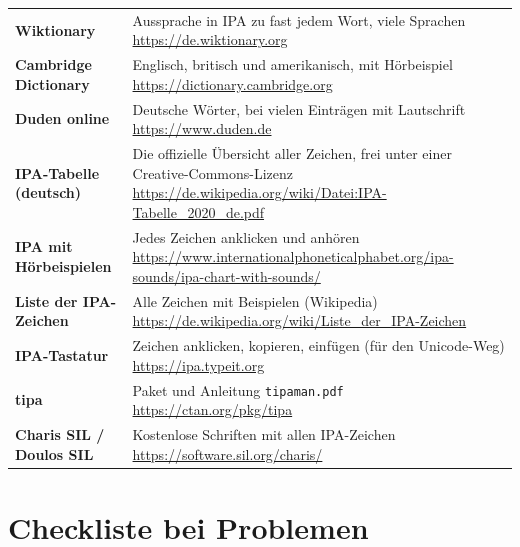 \begin{center}
\small
\begin{tabular}{@{}>{\raggedright\arraybackslash}p{3.8cm}>{\raggedright\arraybackslash}p{11.6cm}@{}}
	\toprule
	\textbf{Wiktionary} & Aussprache in IPA zu fast jedem Wort, viele Sprachen \newline \url{https://de.wiktionary.org} \\ \addlinespace
	\textbf{Cambridge Dictionary} & Englisch, britisch und amerikanisch, mit Hörbeispiel \newline \url{https://dictionary.cambridge.org} \\ \addlinespace
	\textbf{Duden online} & Deutsche Wörter, bei vielen Einträgen mit Lautschrift \newline \url{https://www.duden.de} \\ \addlinespace
	\textbf{IPA-Tabelle (deutsch)} & Die offizielle Übersicht aller Zeichen, frei unter einer Creative-Commons-Lizenz \newline \url{https://de.wikipedia.org/wiki/Datei:IPA-Tabelle_2020_de.pdf} \\ \addlinespace
	\textbf{IPA mit Hörbeispielen} & Jedes Zeichen anklicken und anhören \newline \url{https://www.internationalphoneticalphabet.org/ipa-sounds/ipa-chart-with-sounds/} \\ \addlinespace
	\textbf{Liste der IPA-Zeichen} & Alle Zeichen mit Beispielen (Wikipedia) \newline \url{https://de.wikipedia.org/wiki/Liste_der_IPA-Zeichen} \\ \addlinespace
	\textbf{IPA-Tastatur} & Zeichen anklicken, kopieren, einfügen (für den Unicode-Weg) \newline \url{https://ipa.typeit.org} \\ \addlinespace
	\textbf{tipa} & Paket und Anleitung \texttt{tipaman.pdf} \newline \url{https://ctan.org/pkg/tipa} \\ \addlinespace
	\textbf{Charis SIL / Doulos SIL} & Kostenlose Schriften mit allen IPA-Zeichen \newline \url{https://software.sil.org/charis/} \\
	\bottomrule
\end{tabular}
\end{center}



\section{Checkliste bei Problemen}

